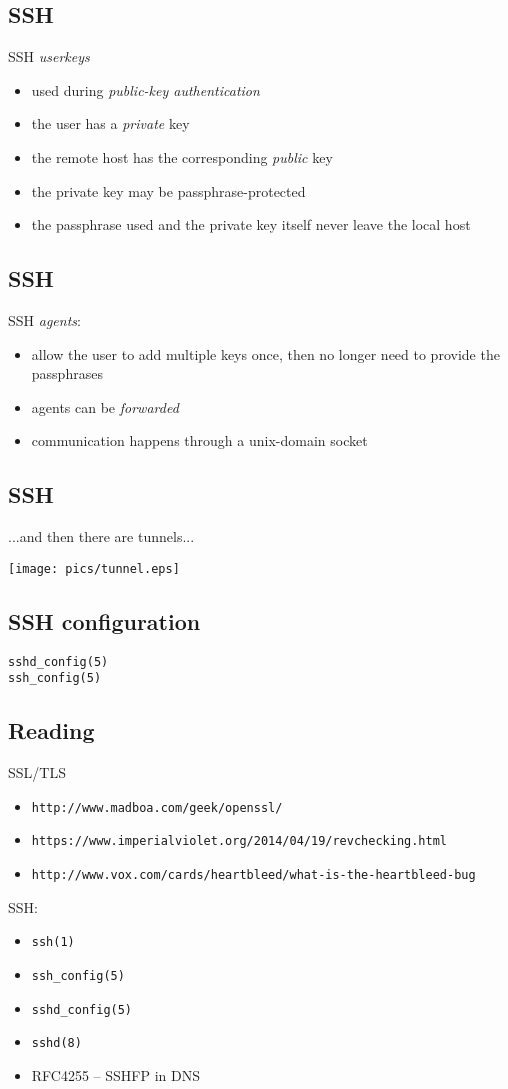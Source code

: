 \documentclass[xga]{xdvislides}
\begin{document}
\subsection{SSH}
SSH {\em userkeys}
\begin{itemize}
	\item used during {\em public-key authentication}
	\item the user has a {\em private} key
	\item the remote host has the corresponding {\em public} key
	\item the private key may be passphrase-protected
	\item the passphrase used and the private key itself never leave the
	      local host
\end{itemize}

\subsection{SSH}
SSH {\em agents}:
\begin{itemize}
	\item allow the user to add multiple keys once, then no longer need to
		provide the passphrases
	\item agents can be {\em forwarded}
	\item communication happens through a unix-domain socket
\end{itemize}

\subsection{SSH}
...and then there are tunnels...
\begin{center}
	\texttt{[image: pics/tunnel.eps]} \\
\end{center}


\subsection{SSH configuration}
\vspace{.5in}
\begin{center}
	\Huge
	\verb+sshd_config(5)+
	\\
	\verb+ssh_config(5)+
\end{center}
\Normalsize

\subsection{Reading}
SSL/TLS
\begin{itemize}
	\item {\tt http://www.madboa.com/geek/openssl/}
	\item {\tt https://www.imperialviolet.org/2014/04/19/revchecking.html}
	\item {\tt http://www.vox.com/cards/heartbleed/what-is-the-heartbleed-bug}
\end{itemize}

SSH:
\begin{itemize}
	\item \verb+ssh(1)+
	\item \verb+ssh_config(5)+
	\item \verb+sshd_config(5)+
	\item \verb+sshd(8)+
	\item RFC4255 -- SSHFP in DNS
\end{itemize}
\end{document}
